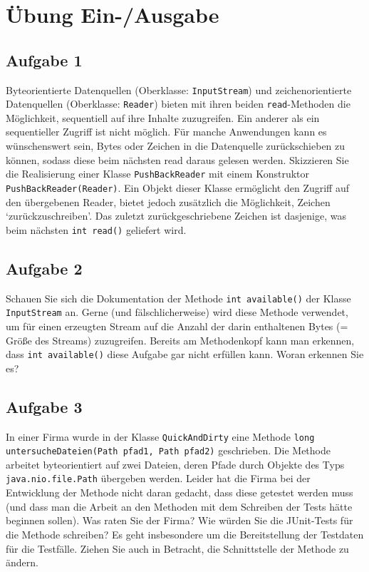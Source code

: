 \chapter{Übung Ein-/Ausgabe}

\section{Aufgabe 1}
Byteorientierte Datenquellen (Oberklasse: \lstinline{InputStream}) und zeichenorientierte Datenquellen (Oberklasse: \lstinline{Reader}) bieten mit ihren beiden \lstinline{read}-Methoden die Möglichkeit, sequentiell auf ihre Inhalte
zuzugreifen. Ein anderer als ein sequentieller Zugriff ist nicht möglich.
Für manche Anwendungen kann es wünschenswert sein, Bytes oder Zeichen in die Datenquelle
zurückschieben zu können, sodass diese beim nächsten read daraus gelesen werden.
Skizzieren Sie die Realisierung einer Klasse \lstinline{PushBackReader} mit einem Konstruktor
\lstinline{PushBackReader(Reader)}. Ein Objekt dieser Klasse ermöglicht den Zugriff auf den übergebenen
Reader, bietet jedoch zusätzlich die Möglichkeit, Zeichen `zurückzuschreiben'. Das zuletzt zurückgeschriebene Zeichen ist dasjenige, was beim nächsten \lstinline{int read()} geliefert wird.

\section{Aufgabe 2}

Schauen Sie sich die Dokumentation der Methode \lstinline{int available()} der Klasse \lstinline{InputStream}
an. Gerne (und fälschlicherweise) wird diese Methode verwendet, um für einen erzeugten Stream
auf die Anzahl der darin enthaltenen Bytes (= Größe des Streams) zuzugreifen. Bereits am Methodenkopf kann man erkennen, dass \lstinline{int available()} diese Aufgabe gar nicht erfüllen kann.
Woran erkennen Sie es?

\section{Aufgabe 3}
In einer Firma wurde in der Klasse \lstinline{QuickAndDirty} eine Methode
\lstinline{long untersucheDateien(Path pfad1, Path pfad2)}
geschrieben. Die Methode arbeitet byteorientiert auf zwei Dateien, deren Pfade durch Objekte des
Typs \lstinline{java.nio.file.Path} übergeben werden.
Leider hat die Firma bei der Entwicklung der Methode nicht daran gedacht, dass diese getestet werden muss (und dass man die Arbeit an den Methoden mit dem Schreiben der Tests hätte beginnen
sollen).
Was raten Sie der Firma? Wie würden Sie die JUnit-Tests für die Methode schreiben? Es geht insbesondere um die Bereitstellung der Testdaten für die Testfälle. Ziehen Sie auch in Betracht, die
Schnittstelle der Methode zu ändern.

